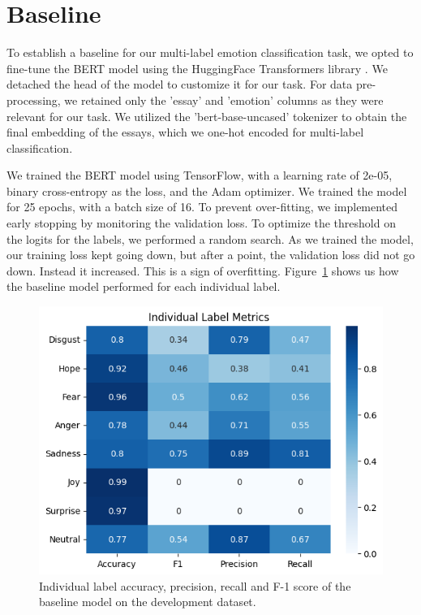 \documentclass[11pt]{article}
\begin{document}
\section{Baseline}

To establish a baseline for our multi-label emotion classification task, we opted to fine-tune the BERT model \citep{devlin2019bert} using the HuggingFace Transformers library \citep{wolf2020huggingfaces}. We detached the head of the model to customize it for our task. For data pre-processing, we retained only the 'essay' and 'emotion' columns as they were relevant for our task. We utilized the 'bert-base-uncased' tokenizer to obtain the final embedding of the essays, which we one-hot encoded for multi-label classification.

We trained the BERT model using TensorFlow, with a learning rate of 2e-05, binary cross-entropy as the loss, and the Adam optimizer. We trained the model for 25 epochs, with a batch size of 16. To prevent over-fitting, we implemented early stopping by monitoring the validation loss. To optimize the threshold on the logits for the labels, we performed a random search. As we trained the model, our training loss kept going down, but after a point, the validation loss did not go down. Instead it increased. This is a sign of overfitting. Figure~\ref{fig:baseline_metrics} shows us how the baseline model performed for each individual label.

\begin{figure}[bhp]
\includegraphics[width=\columnwidth]{BERT_Dev_Metrics.png}
\caption{Individual label accuracy, precision, recall and F-1 score of the baseline model on the development dataset.}
\label{fig:baseline_metrics}
\end{figure}
\end{document}
